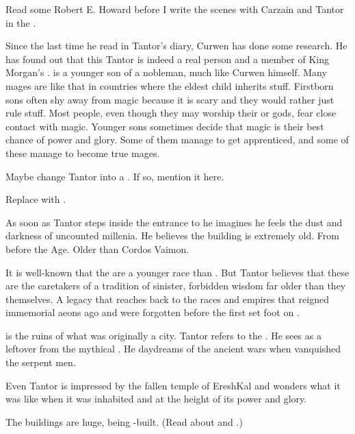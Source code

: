 \begin{changes}
    Read some Robert E. Howard before I write the scenes with Carzain and Tantor in the \wylde. 
    
    Since the last time he read in Tantor's diary, Curwen has done some research.
    He has found out that this \Jirad Tantor is indeed a real person and a member of King Morgan's \ishrah.
    \Jirad is a younger son of a nobleman, much like Curwen himself. 
    Many mages are like that in countries where the eldest child inherits stuff.
    Firstborn sons often shy away from magic because it is scary and they would rather just rule stuff.
    Most people, even though they may worship their \Archons or gods, fear close contact with magic. 
    Younger sons sometimes decide that magic is their best chance of power and glory.
    Some of them manage to get apprenticed, and some of these manage to become true mages. 
    
    Maybe change Tantor into a \scatha. 
    If so, mention it here.
    
    Replace  with . 
    
    As soon as Tantor steps inside the entrance to \EreshKal{} he imagines he feels the dust and darkness of uncounted millenia. 
    He believes the building is extremely old. 
    From before the \Human{} Age. 
    Older than Cordos Vaimon. 
    
    It is well-known that the \meccara{} are a younger race than \humans. 
    But Tantor believes that these \EreshKali{} are the caretakers of a tradition of sinister, forbidden wisdom far older than they themselves. 
    A legacy that reaches back to the races and empires that reigned immemorial aeons ago and were forgotten before the first \humans{} set foot on \Miith. 
    
    \EreshKal{} is the ruins of what was originally a \quiljaaran{} city. 
    Tantor refers to the . 
    He sees \EreshKal{} as a leftover from the mythical . 
    He daydreams of the ancient wars when \humans{} vanquished the serpent men. 

    Even \Jirad Tantor is impressed by the fallen temple of EreshKal and wonders what it was like when it was inhabited and at the height of its power and glory.
    
    The buildings are huge, being \quiljaaran-built. 
    (Read about  and .) 


\end{changes}
